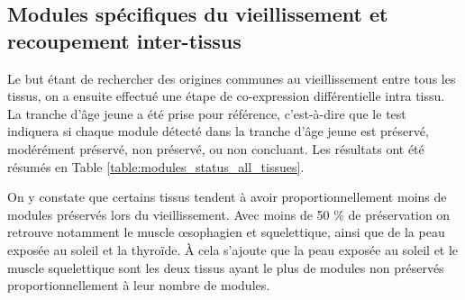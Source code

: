 \subsection{Modules spécifiques du vieillissement et recoupement inter-tissus}

Le but étant de rechercher des origines communes au vieillissement entre tous les tissus, on a ensuite effectué une étape de co-expression différentielle intra tissu. La tranche d'âge jeune a été prise pour référence, c’est-à-dire que le test indiquera si chaque module détecté dans la tranche d'âge jeune est préservé, modérément préservé, non préservé, ou non concluant. Les résultats ont été résumés en Table \ref{table:modules_status_all_tissues}. 

On y constate que certains tissus tendent à avoir proportionnellement moins de modules préservés lors du vieillissement. Avec moins de 50 \% de préservation on retrouve notamment le muscle œsophagien et squelettique, ainsi que de la peau exposée au soleil et la thyroïde. À cela s'ajoute que la peau exposée au soleil et le muscle squelettique sont les deux tissus ayant le plus de modules non préservés proportionnellement à leur nombre de modules.

